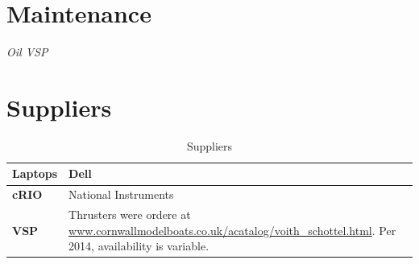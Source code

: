 \documentclass[a4paper,twoside,english]{report}
\providecommand{\tabularnewline}{\\}
\begin{document}
\newpage{}

\chapter{Maintenance }

\textit{Oil VSP}

\chapter{Suppliers}

\begin{table}[h!]
\begin{centering}
\begin{tabular}{>{\bfseries}l>{\raggedright}p{7cm}}
\toprule 
Laptops  & Dell\tabularnewline
\midrule 
cRIO  & National Instruments\tabularnewline
\midrule 
VSP & Thrusters were ordere at \url{www.cornwallmodelboats.co.uk/acatalog/voith_schottel.html}.
Per 2014, availability is variable.\tabularnewline
\bottomrule
\end{tabular}\caption{Suppliers}
\par\end{centering}
\centering{}\label{tab:POC-1} 
\end{table}

\FloatBarrier
\end{document}
